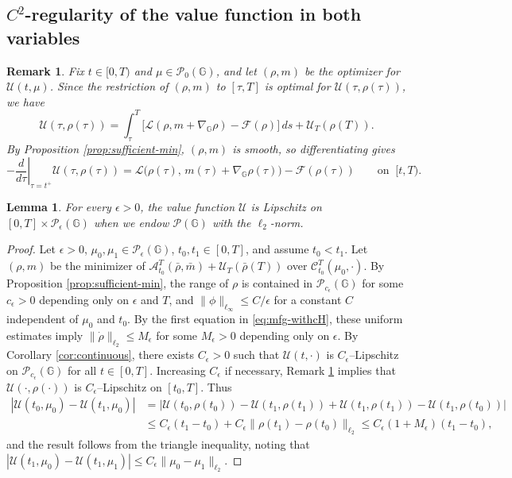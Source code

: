 \documentclass[10pt]{article}
\newtheorem{lemma}[theorem]{Lemma}
\newtheorem{remark}[theorem]{Remark}
\numberwithin{equation}{section}
\newcommand{\cA}{ \mathcal{A}}
\newcommand{\cC}{ \mathcal{C}}
\newcommand{\cF}{ \mathcal{F}}
\newcommand{\cL}{ \mathcal{L}}
\newcommand{\cP}{ \mathcal{P}}
\newcommand{\cU}{ \mathcal{U}}
\newcommand{\bG}{\mathbb G}
\def\cL{\mathcal{L}}
\def\G{\mathbb{G}}
\begin{document}
\subsection{\texorpdfstring{$C^2$-regularity}{C2-regularity} of the value function in both variables}\label{sec:visc}
%
%
\begin{remark} \label{rem:diff_char_val} Fix $t\in[0,T)$ and $\mu \in \cP_0(\G)$, and let $(\rho,m)$ be the optimizer for $\cU(t,\mu)$. Since the restriction of $(\rho,m)$ to $[\tau,T]$ is optimal for $\cU(\tau,\rho(\tau))$, we have
\[
\cU(\tau,\rho(\tau)) = \int_\tau^T \big[\cL(\rho, m + \nabla_\bG\rho) - \cF(\rho)\big]\,ds + \cU_T(\rho(T)).
\]
By Proposition \ref{prop:sufficient-min}, $(\rho,m)$ is smooth, so differentiating gives
\[
-\left.\frac{d}{d\tau}\right|_{\tau = t^+}\cU(\tau,\rho(\tau)) = \cL\big(\rho(\tau),\,m(\tau) + \nabla_\bG\rho(\tau)\big) - \cF(\rho(\tau))\qquad \text{on} \;\; [t, T).
\]
\end{remark}
\begin{lemma}\label{lem:cty_int} For every $\epsilon>0$, the value function $\cU$ is Lipschitz on $[0,T]\times \cP_\epsilon(\G)$ when we endow $\cP(\G)$ with the $\ell_2$-norm.
\end{lemma}
%
\begin{proof} Let $\epsilon>0$, $\mu_0, \mu_1 \in \cP_\epsilon(\G)$, $t_0, t_1 \in [0, T]$, and assume $t_0<t_1$. Let $(\rho, m)$ be the minimizer of $\cA_{t_0}^{T}(\bar \rho, \bar m) +\cU_{T}(\bar \rho({T}))$ over $\cC_{t_0}^{T}(\mu_0, \cdot)$. By Proposition \ref{prop:sufficient-min}, the range of $\rho$ is contained in $\cP_{c_\epsilon}(\G)$ for some $c_\epsilon>0$ depending only on $\epsilon$ and $T$, and $\|\phi\|_{\ell_\infty} \leq C/\epsilon$ for a constant $C$ independent of $\mu_0$ and $t_0$. By the first equation in \eqref{eq:mfg-withcH}, these uniform estimates imply $\|\dot \rho\|_{\ell_2} \leq M_\epsilon$ for some $M_\epsilon>0$ depending only on $\epsilon$.
By Corollary \ref{cor:continuous}, there exists $C_\epsilon>0$ such that $\cU(t, \cdot)$ is $C_\epsilon$--Lipschitz on $\cP_{c_\epsilon}(\G)$ for all $t \in [0, T]$. Increasing $C_\epsilon$ if necessary, Remark \ref{rem:diff_char_val} implies that $\cU(\cdot, \rho(\cdot))$ is $C_\epsilon$--Lipschitz on $[t_0, T]$. Thus
\begin{align*}
|\cU(t_0,\mu_0) - \cU(t_1,\mu_0)| &= |\cU(t_0,\rho(t_0)) - \cU(t_1,\rho(t_1)) + \cU(t_1,\rho(t_1)) - \cU(t_1,\rho(t_0))|\\
 &\leq  C_\epsilon(t_1-t_0)+C_\epsilon\|\rho(t_1)-\rho(t_0)\|_{\ell_2} \leq C_\epsilon(1+M_\epsilon)(t_1-t_0),
\end{align*}
and the result follows from the triangle inequality, noting that $|\cU(t_1,\mu_0)-\cU(t_1,\mu_1)|\le C_{\epsilon}\|\mu_0-\mu_1\|_{\ell_2}.$ 
\end{proof}
\end{document}
